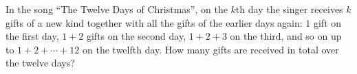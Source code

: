 In the song ``The Twelve Days of Christmas'', on the $k$th day the singer receives $k$ gifts of a new kind together with all the gifts of the earlier days again: $1$ gift on the first day, $1+2$ gifts on the second day, $1+2+3$ on the third, and so on up to $1+2+\cdots+12$ on the twelfth day. How many gifts are received in total over the twelve days?
